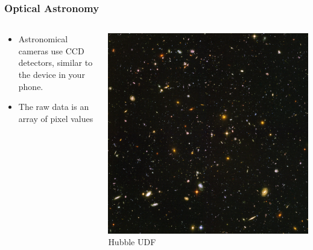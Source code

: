 \documentclass{beamer}
\begin{document}
\frame
{

    \frametitle{Optical Astronomy}


    \begin{columns}
        \begin{column}{0.5\textwidth}
            \begin{itemize}

                \item Astronomical cameras use CCD detectors, similar to the device
                    in your phone.
                    
                \item The raw data is an array of pixel values



            \end{itemize}
        \end{column}
        \begin{column}{0.5\textwidth}
            \begin{center}
                \includegraphics[width=\textwidth]{UDF_half.jpg}
                \newline
                {\tiny Hubble UDF}
            \end{center}

            
        \end{column}
    \end{columns}


}
\end{document}
